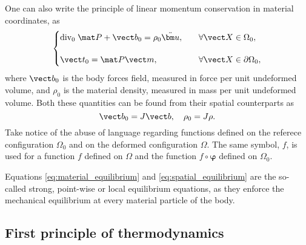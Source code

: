 One can also write the principle of linear momentum conservation in material coordinates, as
\begin{equation}
    \begin{cases}
        \text{div}_0\;\mat P + \vect b_0 = \rho_0 \ddot{\bm u},&\quad\forall \vect X\in \Omega_0,\\[12pt]
        \vect t_0 = \mat P \vect m,&\quad \forall\vect X\in\partial\Omega_0,
    \end{cases}\label{eq:spatial_equilibrium}
\end{equation}
where $\vect b_0$ is the body forces field, measured in force per unit undeformed volume, and $\rho_0$ is the material density, measured in mass per unit undeformed volume.
Both these quantities can be found from their spatial counterparts as
\begin{equation}
    \vect b_0 = J\vect b,\quad \rho_0 = J\rho.
\end{equation}
Take notice of the abuse of language regarding functions defined on the referece configuration \(\Omega_0\) and on the deformed configuration \(\Omega\).
The same symbol, \(f\), is used for a function \(f\) defined on \(\Omega\) and the function \(f\circ \bm\varphi\) defined on \(\Omega_0\).

Equations \eqref{eq:material_equilibrium} and \eqref{eq:spatial_equilibrium} are the so-called strong, point-wise or local equilibrium equations, as they enforce the mechanical equilibrium at every material particle of the body.

\subsection{First principle of thermodynamics} \label{sec:first_principle_thermo}

